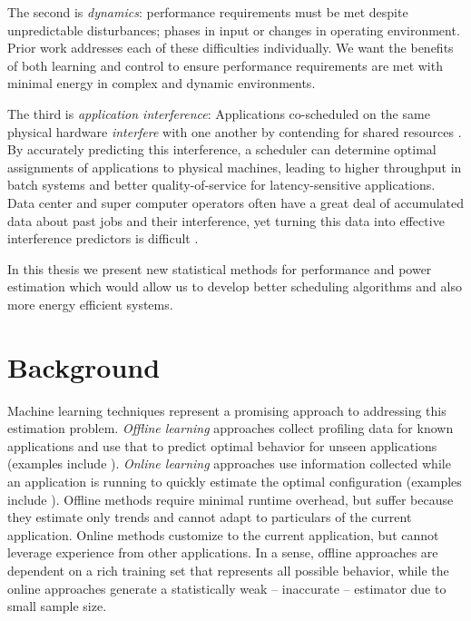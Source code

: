 The second is \emph{dynamics}: perfor\-mance requirements
must be met despite unpredictable disturbances; \eg{} phases in input
or changes in operating environment.  Prior work addresses each of
these difficulties individually. We want the benefits of both learning and control
to ensure
performance requirements are met with minimal energy in complex and
dynamic environments.

The third is \emph{application interference}: Applications co-scheduled on the
same physical hardware \emph{interfere} with one another by contending for shared resources
\cite{dwyer2012practical,kambadur2012measuring,Bubble-flux,merkel2010resource}. By accurately predicting this interference, a scheduler
can determine optimal assignments of applications to physical
machines, leading to higher throughput in batch systems and better
quality-of-service for latency-sensitive applications. Data center and super computer operators often have a great deal of
accumulated data about past jobs and their interference, yet turning
this data into effective interference predictors is difficult
\cite{kambadur2012measuring}.

In this thesis we present new statistical methods for performance and power estimation which would allow us to develop better scheduling algorithms and also more energy efficient systems.



\section{Background}
Machine learning techniques represent a promising approach to
addressing this estimation problem.  \emph{Offline learning}
approaches collect profiling data for known applications and use that
to predict optimal behavior for unseen applications (examples include
\cite{Yi2003,Koala,LeeBrooks2006,CPR,ChenJohn2011}).  \emph{Online
 learning} approaches use information collected while an application
is running to quickly estimate the optimal configuration (examples
include
\cite{Li2006,Flicker,ParallelismDial,Ponamarev,petabricksDynamic,LeeBrooks,TAAS}).
Offline methods require minimal runtime overhead, but suffer because
they estimate only trends and cannot adapt to particulars of the
current application.  Online methods customize to the current
application, but cannot leverage experience from other applications.
In a sense, offline approaches are dependent on a rich training set
that represents all possible behavior, while the online approaches
generate a statistically weak -- \ie inaccurate -- estimator due to
small sample size.

